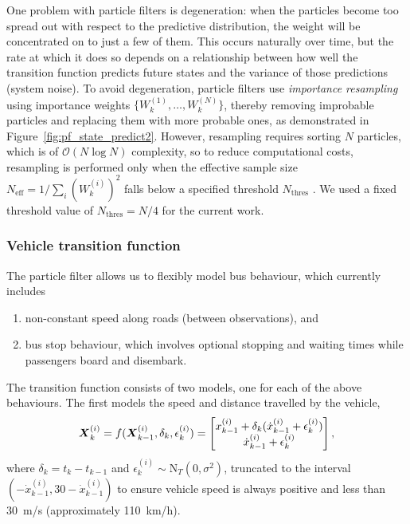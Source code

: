 One problem with particle filters is degeneration:
when the particles become too spread out with respect to the predictive distribution,
the weight will be concentrated on to just a few of them.
This occurs naturally over time, but the rate at which it does so depends 
on a relationship between how well the transition function predicts future states
and the variance of those predictions (system noise).
To avoid degeneration,
particle filters use \emph{importance resampling}
using importance weights $\{W_k^{(1)}, \ldots, W_k^{(N)}\}$,
thereby removing improbable particles and replacing them with more probable ones,
as demonstrated in Figure~\ref{fig:pf_state_predict2}.
However, resampling requires sorting $N$ particles,
which is of $\mathcal{O}(N\log N)$ complexity,
so to reduce computational costs, resampling is performed only when
the effective sample size $N_{\text{eff}} = 1 / \sum_i (W_k^{(i)})^2$
falls below a specified threshold $N_{\text{thres}}$
\citep{Gustafsson_2002}.
We used a fixed threshold value of $N_{\text{thres}} = N/4$
for the current work.


\subsubsection{Vehicle transition function}
\label{sec:pf_prediction}

The particle filter allows us to flexibly model bus behaviour,
which currently includes
\begin{enumerate}
\item non-constant speed along roads (between observations), and
\item bus stop behaviour, which involves optional stopping and waiting times
    while passengers board and disembark.
\end{enumerate}
The transition function consists of two models,
one for each of the above behaviours.
The first models the speed and distance travelled by the vehicle,
\begin{equation}
\label{eq:trans_newton}
\mbox{$\boldsymbol{X}$}_k^{(i)} = f(\mbox{$\boldsymbol{X}$}_{k-1}^{(i)}, \delta_k, \epsilon_k^{(i)}) = 
    \begin{bmatrix}
        x_{k-1}^{(i)} + \delta_k(\dot x_{k-1}^{(i)} + \epsilon_k^{(i)}) \\
        \dot x_{k-1}^{(i)} + \epsilon_k^{(i)}
    \end{bmatrix},
\end{equation}
where $\delta_k = t_k - t_{k-1}$
and $\epsilon_k^{(i)}\sim\mathrm{N}_T(0, \sigma^2)$, truncated to the interval
$(-\dot x_{k-1}^{(i)}, 30 - \dot x_{k-1}^{(i)})$
to ensure vehicle speed is always positive and less than 30~m/s
(approximately 110~km/h).


